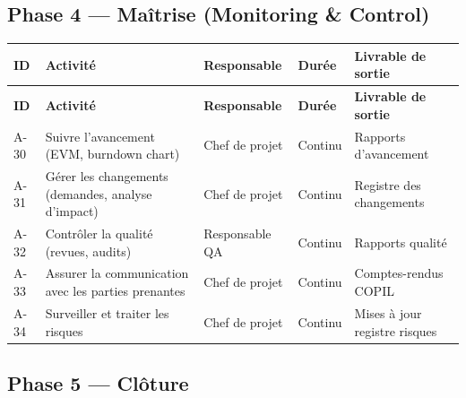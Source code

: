 \documentclass[11pt,a4paper]{article}
\begin{document}
\subsection{Phase 4 --- Maîtrise (Monitoring \& Control)}

\begin{longtable}{|p{1.2cm}|p{5.5cm}|p{2.2cm}|p{2cm}|p{2.5cm}|}
    \hline
    \rowcolor{ifrigray}
    \textbf{ID} & \textbf{Activité} & \textbf{Responsable} & \textbf{Durée} & \textbf{Livrable de sortie} \\
    \hline
    \endfirsthead
    \hline
    \rowcolor{ifrigray}
    \textbf{ID} & \textbf{Activité} & \textbf{Responsable} & \textbf{Durée} & \textbf{Livrable de sortie} \\
    \hline
    \endhead

    A-30 & Suivre l'avancement (EVM, burndown chart) & Chef de projet & Continu & Rapports d'avancement \\
    \hline
    A-31 & Gérer les changements (demandes, analyse d'impact) & Chef de projet & Continu & Registre des changements \\
    \hline
    A-32 & Contrôler la qualité (revues, audits) & Responsable QA & Continu & Rapports qualité \\
    \hline
    A-33 & Assurer la communication avec les parties prenantes & Chef de projet & Continu & Comptes-rendus COPIL \\
    \hline
    A-34 & Surveiller et traiter les risques & Chef de projet & Continu & Mises à jour registre risques \\
    \hline
\end{longtable}

\subsection{Phase 5 --- Clôture}
\end{document}
